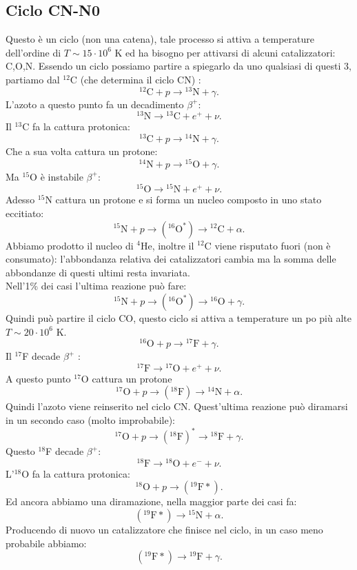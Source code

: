 \subsection{Ciclo CN-N0}%
\label{sub:Ciclo CN-NO}
Questo è un ciclo (non una catena), tale processo si attiva a temperature dell'ordine di $T\sim 15\cdot 10^6$ K ed ha bisogno per attivarsi di alcuni catalizzatori: C,O,N. Essendo un ciclo possiamo partire a spiegarlo da uno qualsiasi di questi 3, partiamo dal ${}^{12}$C (che determina il ciclo CN) :
\[
{}^{12}\text{C}+p \to {}^{13}\text{N}+\gamma
.\] 
L'azoto a questo punto fa un decadimento $\beta^+$:
\[
{}^{13}\text{N}\to {}^{13}\text{C}+e^+ + \nu
.\] 
Il ${}^{13}$C fa la cattura protonica:
\[
{}^{13}\text{C}+ p \to  {}^{14}\text{N} +\gamma
.\]  
Che a sua volta cattura un protone:
\[
{}^{14}\text{N}+p\to {}^{15}\text{O}+\gamma
.\] 
Ma ${}^{15}$O è instabile $\beta^+$:
\[
{}^{15}\text{O}\to {}^{15}\text{N}+e^++\nu
.\] 
Adesso ${}^{15}$N cattura un protone e si forma un nucleo composto in uno stato eccitiato:
\[
    {}^{15}\text{N}+p \to \left({}^{16}\text{O}^*\right)
    \to {}^{12}\text{C}+\alpha
.\] 
Abbiamo prodotto il nucleo di ${}^{4}$He, inoltre il ${}^{12}$C viene risputato fuori (non è consumato): l'abbondanza relativa dei catalizzatori cambia ma la somma delle abbondanze di questi ultimi resta invariata.\\
Nell'1\% dei casi l'ultima reazione può fare:
\[
    {}^{15}\text{N}+p \to \left({}^{16}\text{O}^*\right)
    \to {}^{16}\text{O}+\gamma
.\] 
Quindi può partire il ciclo CO, questo ciclo si attiva a temperature un po più alte $T\sim 20\cdot 10^{6}$ K.
\[
{}^{16}\text{O}+ p\to {}^{17}\text{F}+\gamma
.\] 
Il ${}^{17}$F decade $\beta^+$  :
\[
{}^{17}\text{F}\to {}^{17}\text{O}+e^++\nu
.\] 
A questo punto ${}^{17}$O cattura un protone
\[
    {}^{17}\text{O}+p\to \left({}^{18}\text{F}\right) 
    \to {}^{14}\text{N}+\alpha
.\] 
Quindi l'azoto viene reinserito nel ciclo CN. Quest'ultima reazione può diramarsi in un secondo caso (molto improbabile):
\[
    {}^{17}\text{O}+p\to \left({}^{18}\text{F}\right)^*
    \to {}^{18}\text{F}+\gamma
.\] 
Questo ${}^{18}$F decade $\beta^+$:
\[
{}^{18}\text{F}\to {}^{18}\text{O}+e^-+\nu
.\] 
L'${}^{18}$O fa la cattura protonica:
\[
{}^{18}\text{O}+p\to \left({}^{19}\text{F}*\right)
.\] 
Ed ancora abbiamo una diramazione, nella maggior parte dei casi fa:
\[
\left({}^{19}\text{F}*\right)\to {}^{15}\text{N}+\alpha
.\] 
Producendo di nuovo un catalizzatore che finisce nel ciclo, in un caso meno probabile abbiamo:
\[
\left({}^{19}\text{F}*\right)\to {}^{19}\text{F}+\gamma
.\] 
